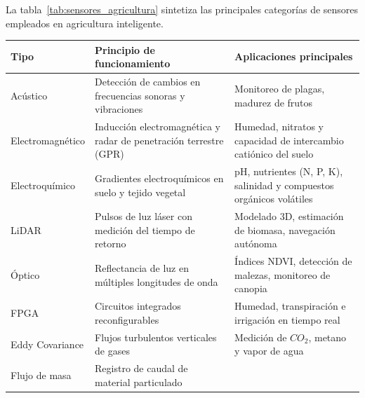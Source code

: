 La tabla~\ref{tab:sensores_agricultura} sintetiza las principales
categorías de sensores empleados en agricultura inteligente.
\begin{table}[H]
      \centering
      \begin{tabularx}{\textwidth}{
            >{\raggedright\arraybackslash}p{2.8cm}
            >{\raggedright\arraybackslash}X
            >{\raggedright\arraybackslash}X}
            \toprule
            \textbf{Tipo} & \textbf{Principio de funcionamiento}
                          & \textbf{Aplicaciones principales}                    \\
            \midrule
            Acústico
                          & Detección de cambios en frecuencias sonoras y
            vibraciones
                          & Monitoreo de plagas, madurez de frutos               \\
            Electromagnético
                          & Inducción electromagnética y radar de penetración
            terrestre (GPR)
                          & Humedad, nitratos y capacidad de intercambio
            catiónico del suelo                                                  \\
            Electroquímico
                          & Gradientes electroquímicos en suelo y tejido vegetal
                          & pH, nutrientes (N, P, K), salinidad y compuestos
            orgánicos volátiles                                                  \\
            LiDAR
                          & Pulsos de luz láser con medición del tiempo de
            retorno
                          & Modelado 3D, estimación de biomasa, navegación
            autónoma                                                             \\
            Óptico
                          & Reflectancia de luz en múltiples longitudes de onda
                          & Índices NDVI, detección de malezas, monitoreo de
            canopia                                                              \\
            FPGA
                          & Circuitos integrados reconfigurables
                          & Humedad, transpiración e irrigación en tiempo real   \\
            Eddy Covariance
                          & Flujos turbulentos verticales de gases
                          & Medición de \(CO_2\), metano y vapor de agua         \\
            Flujo de masa
                          & Registro de caudal de material particulado

\end{tabularx}
\end{table}

